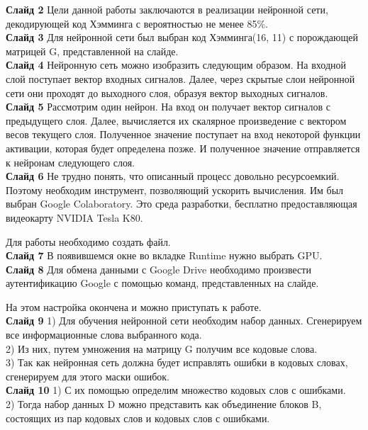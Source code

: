\documentclass[a4paper]{article}
\begin{document}
\textbf{Слайд 2}
Цели данной работы заключаются в реализации нейронной сети, декодирующей код Хэмминга с вероятностью не менее 85\%. \\

\textbf{Слайд 3}
Для нейронной сети был выбран код Хэмминга(16, 11) с порождающей матрицей G, представленной на слайде.\\

\textbf{Слайд 4}
Нейронную сеть можно изобразить следующим образом. На входной слой поступает вектор входных сигналов. Далее, через скрытые слои нейронной сети они проходят до выходного слоя, образуя вектор выходных сигналов.\\

\textbf{Слайд 5}
Рассмотрим один нейрон. На вход он получает вектор сигналов с предыдущего слоя. Далее, вычисляется их скалярное произведение с вектором весов текущего слоя. Полученное значение поступает на вход некоторой функции активации, которая будет определена позже. И полученное значение отправляется к нейронам следующего слоя. \\

\textbf{Слайд 6}
Не трудно понять, что описанный процесс довольно ресурсоемкий. Поэтому необходим инструмент, позволяющий ускорить вычисления. Им был выбран Google Colaboratory. Это среда разработки, бесплатно предоставляющая видеокарту NVIDIA Tesla K80. 

Для работы необходимо создать файл.\\

\textbf{Слайд 7}
В появившемся окне во вкладке Runtime нужно выбрать GPU. \\

\textbf{Слайд 8}
Для обмена данными с Google Drive необходимо произвести аутентификацию Google с помощью команд, представленных на слайде. 

На этом настройка окончена и можно приступать к работе.\\

\textbf{Слайд 9}
1) Для обучения нейронной сети необходим набор данных. Сгенерируем все информационные слова выбранного кода.\\
2) Из них, путем умножения на матрицу G получим все кодовые слова.\\
3) Так как нейронная сеть должна будет исправлять ошибки в кодовых словах, сгенерируем для этого маски ошибок.\\

\textbf{Слайд 10}
1) С их помощью определим множество кодовых слов с ошибками. \\
2) Тогда набор данных D можно представить как объединение блоков B, состоящих из пар кодовых слов и кодовых слов с ошибками.\\
\end{document}
